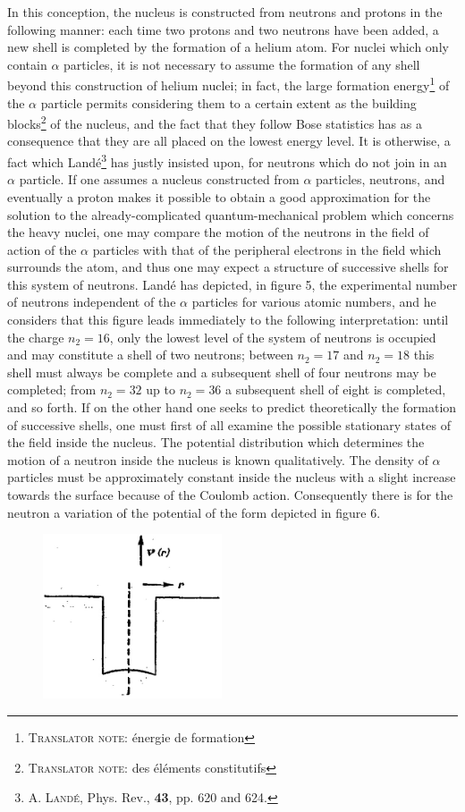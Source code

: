 \documentclass[a4paper,11pt]{article}
\newcommand{\?}[2]{#1\footnote{\textsc{Translator note}: #2}}
\newcommand{\citeauthor}[1]{\textsc{#1}}
\newcommand{\citepub}[1]{#1}
\newcommand{\citevol}[1]{\textbf{#1}}
\newcommand{\citepage}[1]{#1}
\begin{document}
{{In this conception, the nucleus is constructed from neutrons and protons in the following manner: each time two protons and two neutrons have been added, a new shell is completed by the formation of a helium atom. For nuclei which only contain $\alpha$ particles, it is not necessary to assume the formation of any shell beyond this construction of helium nuclei; in fact, the large \?{formation energy}{énergie de formation} of the $\alpha$ particle permits considering them to a certain extent as \?{the building blocks}{des éléments constitutifs} of the nucleus, and the fact that they follow Bose statistics has as a consequence that they are all placed on the lowest energy level. It is otherwise, a fact which Landé\footnote{\citeauthor{A. Landé}, \citepub{Phys. Rev.}, \citevol{43}, \citepage{pp. 620 and 624}.} has justly insisted upon, for neutrons which do not join in an $\alpha$ particle. If one assumes a nucleus constructed from $\alpha$ particles, neutrons, and eventually a proton makes it possible to obtain a good approximation for the solution to the already-complicated quantum-mechanical problem which concerns the heavy nuclei, one may compare the motion of the neutrons in the field of action of the $\alpha$ particles with that of the peripheral electrons in the field which surrounds the atom, and thus one may expect a structure of successive shells for this system of neutrons. Landé has depicted, in figure 5, the experimental number of neutrons independent of the $\alpha$ particles for various atomic numbers, and he considers that this figure leads immediately to the following interpretation: until the charge $n_2=16$, only the lowest level of the system of neutrons is occupied and may constitute a shell of two neutrons; between $n_2 = 17$ and $n_2=18$ this shell must always be complete and a subsequent shell of four neutrons may be completed; from $n_2=32$ up to $n_2=36$ a subsequent shell of eight is completed, and so forth. If on the other hand one seeks to predict theoretically the formation of successive shells, one must first of all examine the possible stationary states of the field inside the nucleus.  The potential distribution which determines the motion of a neutron inside the nucleus is known qualitatively. The density of $\alpha$ particles must be approximately constant inside the nucleus with a slight increase towards the surface because of the Coulomb action. Consequently there is for the neutron a variation of the potential of the form depicted in figure 6.
\begin{figure}[h!]
\centering
\includegraphics[width=150pt]{images/Fig6}

\end{figure}}}
\end{document}

